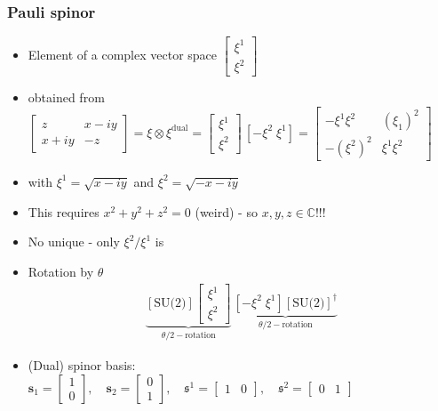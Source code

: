 \documentclass[../main.tex]{subfiles}
\begin{document}
\begin{itemize}
\subsubsection{Pauli spinor}
\begin{itemize}
\item Element of a complex vector space $\left[\begin{matrix}
\xi^1\\ \xi^2
\end{matrix}\right]$
\item obtained from $\left[\begin{matrix}
z  & x-iy\\
x+iy & -z
\end{matrix}\right]
=\xi\otimes\xi^\text{dual}
=\left[\begin{matrix}
\xi^1\\ \xi^2
\end{matrix}\right] \,[-\xi^2\;\xi^1]=\left[\begin{matrix}
-\xi^1\xi^2 & (\xi_1)^2\\
-(\xi^2)^2  & \xi^1\xi^2
\end{matrix}\right] $
\item with $\xi^1=\sqrt{x-iy}$ and $\xi^2=\sqrt{-x-iy}$
\item This requires $x^2+y^2+z^2=0$ (weird) - so $x,y,z\in\mathbb{C}$!!!
\item No unique - only $\xi^2/\xi^1$ is
\item Rotation by $\theta$
\begin{align}
\underbrace{
[\text{SU(2)}] \left[\begin{matrix}
\xi^1\\ \xi^2\end{matrix}\right]}_{\theta/2-\text{rotation}} \,\underbrace{[-\xi^2\;\xi^1]  [\text{SU(2)}]^\dagger}_{\theta/2-\text{rotation}}
\end{align}
\item (Dual) spinor basis: $\mathbf{s}_1=\left[\begin{matrix}1\\0\end{matrix}\right]
,\quad\mathbf{s}_2=\left[\begin{matrix}0\\1\end{matrix}\right]
,\quad\mathfrak{s}^1=\left[\begin{matrix}1&0\end{matrix}\right]
,\quad\mathfrak{s}^2=\left[\begin{matrix}0&1\end{matrix}\right]$

\end{itemize}
\end{itemize}
\end{document}
